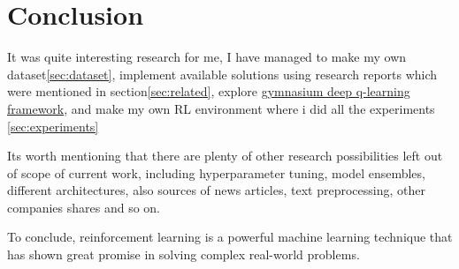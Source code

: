 \documentclass{article}
\begin{document}
\section{Conclusion}
It was quite interesting research for me, I have managed to make my own dataset\ref{sec:dataset}, implement available solutions using research reports which were mentioned in section\ref{sec:related}, explore \href{https://pypi.org/project/gymnasium/}{gymnasium deep q-learning framework}, and make my own RL environment where i did all the experiments \ref{sec:experiments}

Its worth mentioning that there are plenty of other research possibilities left out of scope of current work, including hyperparameter tuning, model ensembles, different architectures, also sources of news articles, text preprocessing, other companies shares and so on.

To conclude, reinforcement learning is a powerful machine learning technique that has shown great promise in solving complex real-world problems.

\pagebreak


\end{document}
